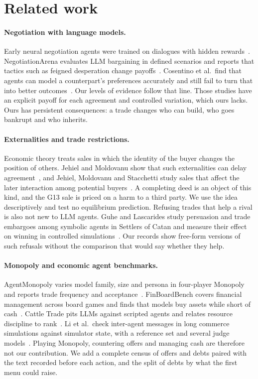 \section{Related work}
\label{sec:related}

\paragraph{Negotiation with language models.}
Early neural negotiation agents were trained on dialogues with hidden rewards~\cite{lewis2017deal}. NegotiationArena evaluates LLM bargaining in defined scenarios and reports that tactics such as feigned desperation change payoffs~\cite{bianchi2024negotiationarena}. Cosentino et al.\ find that agents can model a counterpart's preferences accurately and still fail to turn that into better outcomes~\cite{cosentino2026counterparty}. Our levels of evidence follow that line. Those studies have an explicit payoff for each agreement and controlled variation, which ours lacks. Ours has persistent consequences: a trade changes who can build, who goes bankrupt and who inherits.

\paragraph{Externalities and trade restrictions.}
Economic theory treats sales in which the identity of the buyer changes the position of others. Jehiel and Moldovanu show that such externalities can delay agreement~\cite{jehiel1995delay}, and Jehiel, Moldovanu and Stacchetti study sales that affect the later interaction among potential buyers~\cite{jehiel1996nuclear}. A completing deed is an object of this kind, and the G13 sale is priced on a harm to a third party. We use the idea descriptively and test no equilibrium prediction. Refusing trades that help a rival is also not new to LLM agents. Guhe and Lascarides study persuasion and trade embargoes among symbolic agents in Settlers of Catan and measure their effect on winning in controlled simulations~\cite{guhe2014persuasion}. Our records show free-form versions of such refusals without the comparison that would say whether they help.

\paragraph{Monopoly and economic agent benchmarks.}
AgentMonopoly varies model family, size and persona in four-player Monopoly and reports trade frequency and acceptance~\cite{wu2026agentmonopoly}. FinBoardBench covers financial management across board games and finds that models buy assets while short of cash~\cite{hu2026finboardbench}. Cattle Trade pits LLMs against scripted agents and relates resource discipline to rank~\cite{muller2026cattletrade}. Li et al.\ check inter-agent messages in long commerce simulations against simulator state, with a reference set and several judge models~\cite{li2026arena}. Playing Monopoly, countering offers and managing cash are therefore not our contribution. We add a complete census of offers and debts paired with the text recorded before each action, and the split of debts by what the first menu could raise.


